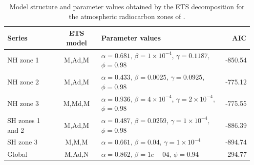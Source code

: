\documentclass[draft,grl]{agutexSI}
\begin{document}
\begin{table}
   \centering
\caption{Model structure and parameter values obtained by the ETS decomposition for the atmospheric radiocarbon zones of \citet{Hua2013Radiocarbon}.} 
   \begin{tabular}{lclr} %
      \toprule
      Series    & ETS model & Parameter values & AIC \\
      \midrule
      NH zone 1    & M,Ad,M & $\alpha = 0.681$, $\beta  = 1 \times 10^{-4}$, 
    $\gamma = 0.1187$, $\phi   = 0.98$ & -850.54\\
    NH zone 2 & M,Ad,M & $\alpha = 0.433$, $\beta  = 0.0025$, $\gamma = 0.0925$, $\phi   = 0.98$ & -775.12 \\
    NH zone 3 & M,Md,M & $\alpha = 0.936$, $\beta  = 4 \times 10^{-4}$, $\gamma = 2 \times 10^{-4}$, $\phi   = 0.98$ & -775.55 \\
    SH zones 1 and 2 & M,Ad,M & $\alpha = 0.487$, $\beta  = 0.0259$, $\gamma = 1 \times 10^{-4}$, $\phi   = 0.98$  & -886.39 \\
    SH zone 3 & M,M,M & $\alpha = 0.661$, $\beta  = 0.04$, $\gamma = 1 \times 10^{-4}$ & -894.74 \\
    Global & M,Ad,N & $\alpha = 0.862$, $\beta  = 1e-04$, $\phi   = 0.94$ & -294.77 \\
      \bottomrule
   \end{tabular}
   \label{tab:modelFits}
\end{table}
\end{document}
